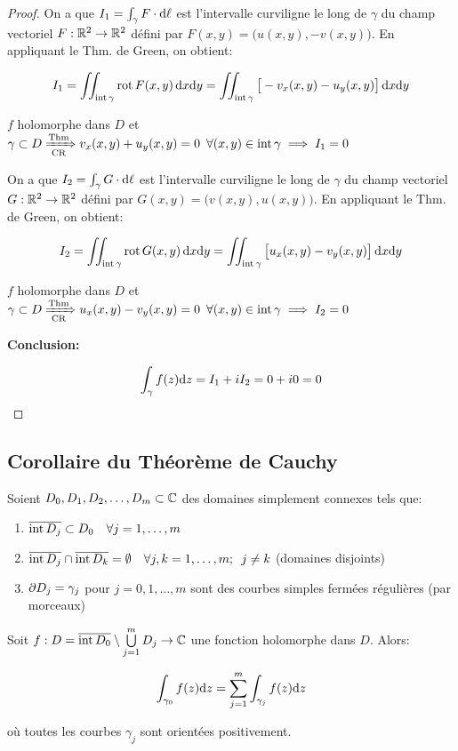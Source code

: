 \begin{proof}
    On a que $I_1 = \int_\gamma F \cdot \mathrm{d}\ell$ est l'intervalle curviligne le long de $\gamma$ du champ vectoriel $F: \mathbb{R}^2 \rightarrow \mathbb{R}^2$ défini par $F(x,y) = \big(u(x,y),-v(x,y)\big)$.
    En appliquant le Thm. de Green, on obtient:
    
    \[
    I_1 = \iint_{\textrm{int}\,\gamma} \textrm{rot}\, F(x,y) \, \mathrm{d}x\mathrm{d}y
    = \iint_{\textrm{int}\,\gamma} \big[-v_x(x,y) - u_y(x,y)\big] \, \mathrm{d}x\mathrm{d}y
    \]
    
    $f$ holomorphe dans $D$ et $\gamma \subset D \xRightarrow[\textrm{CR}]{\textrm{Thm}} v_x(x,y) + u_y(x,y) = 0 \enspace \forall(x,y) \in \textrm{int}\,\gamma \implies I_1 = 0$
    
    On a que $I_2 = \int_\gamma G \cdot \mathrm{d}\ell$ est l'intervalle curviligne le long de $\gamma$ du champ vectoriel $G: \mathbb{R}^2 \rightarrow \mathbb{R}^2$ défini par $G(x,y) = \big(v(x,y),u(x,y)\big)$.
    En appliquant le Thm. de Green, on obtient:
    
    \[
    I_2 = \iint_{\textrm{int}\,\gamma} \textrm{rot}\, G(x,y) \, \mathrm{d}x\mathrm{d}y
    = \iint_{\textrm{int}\,\gamma} \big[u_x(x,y) - v_y(x,y)\big] \, \mathrm{d}x\mathrm{d}y
    \]
    
    $f$ holomorphe dans $D$ et $\gamma \subset D \xRightarrow[\textrm{CR}]{\textrm{Thm}} u_x(x,y) - v_y(x,y) = 0 \enspace \forall(x,y) \in \textrm{int}\,\gamma \implies I_2 = 0$
    
    \textbf{Conclusion:}
    
    \[\int_\gamma f(z) \mathrm{d}z = I_1 + iI_2 = 0 + i0 = 0\]
\end{proof}

\subsection{Corollaire du Théorème de Cauchy}

\begin{corollary}
    Soient $D_0,D_1,D_2,\ldots,D_m \subset \mathbb{C}$ des domaines simplement connexes tels que:
    
    \begin{enumerate}[label=\arabic{enumi})]
    \item 
    $\overline{\textrm{int}\, D_j} \subset D_0 \quad \forall j = 1,\ldots,m$
    \item 
    $\overline{\textrm{int}\, D_j} \cap \overline{\textrm{int}\, D_k} = \emptyset \quad \forall j,k = 1,\ldots,m; \enspace j \neq k$ (domaines disjoints)
    \item 
    $\partial D_j = \gamma_j$ pour $j=0,1,\ldots,m$ sont des courbes simples fermées régulières (par morceaux)
    \end{enumerate}

    Soit $f: D = \overline{\textrm{int}\, D_0} \setminus \bigcup\limits_{j=1}^m D_j \rightarrow \mathbb{C}$ une fonction holomorphe dans $D$.
    Alors:
    
    \[
    \int_{\gamma_0} f(z) \mathrm{d}z = \sum_{j=1}^m \int_{\gamma_j} f(z) \mathrm{d}z
    \]
    
    où toutes les courbes $\gamma_j$ sont orientées positivement. %
\end{corollary}


